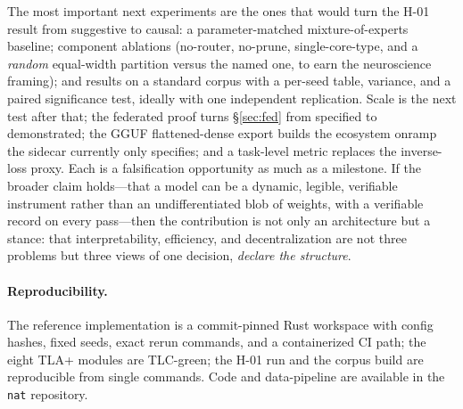 \documentclass[11pt]{article}
\begin{document}
The most important next experiments are the ones that would turn the H-01 result from suggestive to
causal: a parameter-matched mixture-of-experts baseline; component ablations (no-router, no-prune,
single-core-type, and a \emph{random} equal-width partition versus the named one, to earn the
neuroscience framing); and results on a standard corpus with a per-seed table, variance, and a paired
significance test, ideally with one independent replication. Scale is the next test after that; the
federated proof turns \S\ref{sec:fed} from specified to demonstrated; the GGUF flattened-dense export
builds the ecosystem onramp the sidecar currently only specifies; and a task-level metric replaces the
inverse-loss proxy. Each is a falsification opportunity as much as a milestone. If the broader claim
holds---that a model can be a dynamic, legible, verifiable instrument rather than an undifferentiated
blob of weights, with a verifiable record on every pass---then the contribution is not only an
architecture but a stance: that interpretability, efficiency, and decentralization are not three
problems but three views of one decision, \emph{declare the structure}.

\paragraph{Reproducibility.}
The reference implementation is a commit-pinned Rust workspace with config hashes, fixed seeds, exact
rerun commands, and a containerized CI path; the eight TLA+ modules are TLC-green; the H-01 run and
the corpus build are reproducible from single commands. Code and data-pipeline are available in the
\texttt{nat} repository.



\end{document}
